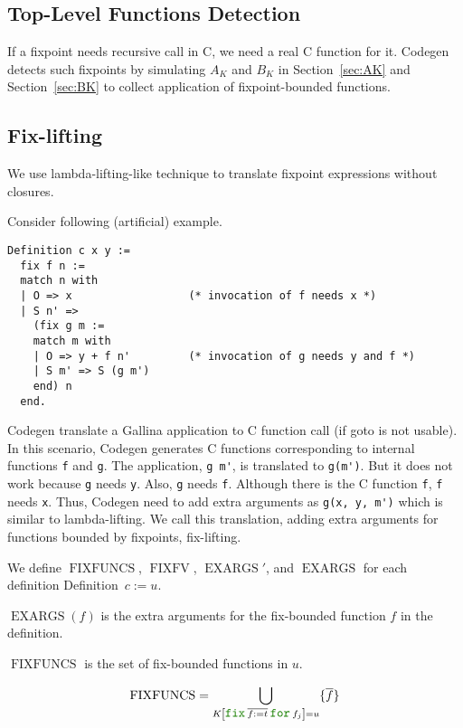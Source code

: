 \documentclass[a4paper,fleqn]{article}
\def\gallina{\textrm{Gallina}}
\def\codegen{\textrm{Codegen}}
\newcommand{\kwDefinition}{\mbox{\color{myviolet}\ttfamily Definition}}
\newcommand{\kwfix}{\mbox{\color{mygreen}\ttfamily fix}}
\newcommand{\kwfor}{\mbox{\color{mygreen}\ttfamily for}}
\newcommand{\ofix}[2]{\kwfix\:{#1}\:\kwfor\:{#2}}
\DeclareMathOperator{\FIXFUNCS}{FIXFUNCS}
\DeclareMathOperator{\FIXFV}{FIXFV}
\DeclareMathOperator{\EXARGS}{EXARGS}
\newcommand{\kwgoto}{\mbox{\color{myviolet}\ttfamily goto}}
\newcommand{\secref}[1]{Section~\ref{#1}}
\newcommand{\rep}[1]{\overline{#1}}
\begin{document}
\subsection{Top-Level Functions Detection}\label{sec:top-level-function-detection}
If a fixpoint needs recursive call in C, we need a real C function for it.
\codegen{} detects such fixpoints by simulating $A_K$ and $B_K$ in \secref{sec:AK} and \secref{sec:BK} to collect application of fixpoint-bounded functions.

\subsection{Fix-lifting}\label{sec:fix-lifting}

We use lambda-lifting-like technique to translate fixpoint expressions without closures.

Consider following (artificial) example.

\begin{lstlisting}
Definition c x y :=
  fix f n :=
  match n with
  | O => x                  (* invocation of f needs x *)
  | S n' =>
    (fix g m :=
    match m with
    | O => y + f n'         (* invocation of g needs y and f *)
    | S m' => S (g m')
    end) n
  end.
\end{lstlisting}

\codegen{} translate a \gallina{} application to C function call (if \kwgoto{} is not usable).
In this scenario, \codegen{} generates C functions corresponding to internal functions \lstinline[style=Cstyle]!f! and \lstinline[style=Cstyle]!g!.
The application, \lstinline!g m'!, is translated to \lstinline[style=Cstyle]!g(m')!.
But it does not work because \lstinline!g! needs \lstinline!y!.
Also, \lstinline!g! needs \lstinline!f!.
Although there is the C function \lstinline!f!, \lstinline!f! needs \lstinline!x!.
Thus, \codegen{} need to add extra arguments as \lstinline[style=Cstyle]!g(x, y, m')! which is similar to lambda-lifting.
We call this translation, adding extra arguments for functions bounded by fixpoints, fix-lifting.

We define $\FIXFUNCS$, $\FIXFV$, $\EXARGS'$, and $\EXARGS$ for each definition \kwDefinition~$c := u$.

$\EXARGS(f)$ is the extra arguments for the fix-bounded function $f$ in the definition.

$\FIXFUNCS$ is the set of fix-bounded functions in $u$.

\[
  \FIXFUNCS = \bigcup_{K\left[\ofix{\rep{f:=t}}{f_j}\right] = u} \{\rep{f}\}
\]
\end{document}
